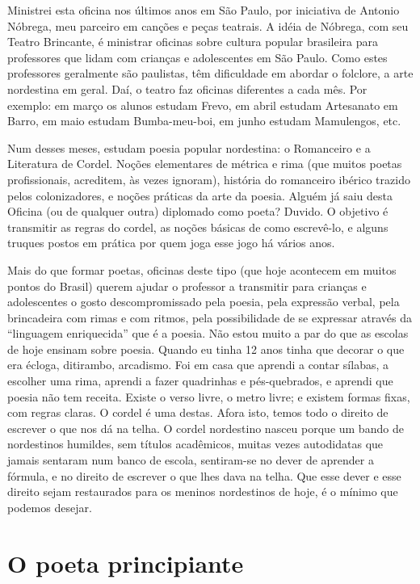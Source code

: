 Ministrei esta oficina nos últimos anos em São Paulo, por iniciativa
de Antonio Nóbrega, meu parceiro em canções e peças teatrais. A idéia
de Nóbrega, com seu Teatro Brincante, é ministrar oficinas sobre
cultura popular brasileira para professores que lidam com crianças e
adolescentes em São Paulo. Como estes professores geralmente são
paulistas, têm dificuldade em abordar o folclore, a arte nordestina
em geral. Daí, o teatro faz oficinas diferentes a cada mês. Por
exemplo: em março os alunos estudam Frevo, em abril estudam
Artesanato em Barro, em maio estudam Bumba-meu-boi, em junho estudam
Mamulengos, etc. 

Num desses meses, estudam poesia popular nordestina: o Romanceiro e a
Literatura de Cordel. Noções elementares de métrica e rima (que
muitos poetas profissionais, acreditem, às vezes ignoram), história
do romanceiro ibérico trazido pelos colonizadores, e noções práticas
da arte da poesia. Alguém já saiu desta Oficina (ou de qualquer
outra) diplomado como poeta? Duvido. O objetivo é transmitir as
regras do cordel, as noções básicas de como escrevê-lo, e alguns
truques postos em prática por quem joga esse jogo há vários anos.

Mais do que formar poetas, oficinas deste tipo (que hoje acontecem em
muitos pontos do Brasil) querem ajudar o professor a transmitir para
crianças e adolescentes o gosto descompromissado pela poesia, pela
expressão verbal, pela brincadeira com rimas e com ritmos, pela
possibilidade de se expressar através da “linguagem enriquecida” que
é a poesia. Não estou muito a par do que as escolas de hoje ensinam
sobre poesia. Quando eu tinha 12 anos tinha que decorar o que era
écloga, ditirambo, arcadismo. Foi em casa que aprendi a contar
sílabas, a escolher uma rima, aprendi a fazer quadrinhas e
pés-quebrados, e aprendi que poesia não tem receita. Existe o verso
livre, o metro livre; e existem formas fixas, com regras claras. O
cordel é uma destas. Afora isto, temos todo o direito de escrever o
que nos dá na telha. O cordel nordestino nasceu porque um bando de
nordestinos humildes, sem títulos acadêmicos, muitas vezes
autodidatas que jamais sentaram num banco de escola, sentiram-se no
dever de aprender a fórmula, e no direito de escrever o que lhes dava
na telha. Que esse dever e esse direito sejam restaurados para os
meninos nordestinos de hoje, é o mínimo que podemos desejar.

\chapter{O poeta principiante}

